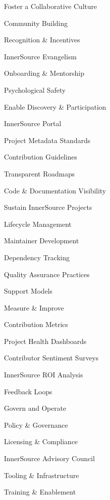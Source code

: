 \documentclass[final]{beamer}
\begin{document}
\begin{frame}[t]
\begin{columns}[T]
\begin{column}{.3\textwidth}
\begin{innersourcesection}{\collaborationicon}{Foster a Collaborative Culture}
    \item Community Building
    \item Recognition \& Incentives
    \item InnerSource Evangelism
    \item Onboarding \& Mentorship
    \item Psychological Safety
\end{innersourcesection}

\begin{innersourcesection}{\discoveryicon}{Enable Discovery \& Participation}
    \item InnerSource Portal
    \item Project Metadata Standards
    \item Contribution Guidelines
    \item Transparent Roadmaps
    \item Code \& Documentation Visibility
\end{innersourcesection}

\begin{innersourcesection}{\sustainicon}{Sustain InnerSource Projects}
    \item Lifecycle Management
    \item Maintainer Development
    \item Dependency Tracking
    \item Quality Assurance Practices
    \item Support Models
\end{innersourcesection}

\begin{innersourcesection}{\measureicon}{Measure \& Improve}
    \item Contribution Metrics
    \item Project Health Dashboards
    \item Contributor Sentiment Surveys
    \item InnerSource ROI Analysis
    \item Feedback Loops
\end{innersourcesection}

\begin{innersourcesection}{\governicon}{Govern and Operate}
    \item Policy \& Governance
    \item Licensing \& Compliance
    \item InnerSource Advisory Council
    \item Tooling \& Infrastructure
    \item Training \& Enablement
\end{innersourcesection}
\end{column}


\end{columns}
\end{frame}
\end{document}
